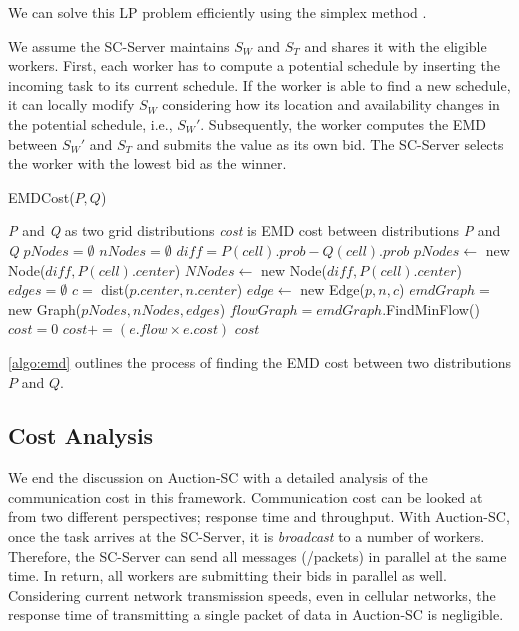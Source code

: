 \noindent We can solve this LP problem efficiently using the simplex method \cite{Dantzig90}.

We assume the SC-Server maintains $S_W$ and $S_T$ and shares it with the eligible workers. First, each worker has to compute a potential schedule by inserting the incoming task to its current schedule. If the worker is able to find a new schedule, it can locally modify $S_W$ considering how its location and availability changes in the potential schedule, i.e., $S_{W}'$. Subsequently, the worker computes the EMD between $S_{W}'$ and $S_T$ and submits the value as its own bid. The SC-Server selects the worker with the lowest bid as the winner.

\begin{algorithm}[h]
\caption{EMDCost($P, Q$)}
\label{algo:emd}
\begin{algorithmic}[1]
\REQUIRE \emph{P} and \emph{Q} as two grid distributions
\ENSURE \emph{cost} is EMD cost between distributions \emph{P} and \emph{Q}
\STATE $pNodes = \emptyset$
\STATE $nNodes = \emptyset$
	\STATE $diff = P(cell).prob - Q(cell).prob$
		\STATE $pNodes \leftarrow$ new Node($diff, P(cell).center$)
	\ELSE
		\STATE $NNodes \leftarrow$ new Node($diff, P(cell).center$)
	\ENDIF
\ENDFOR
\STATE $edges = \emptyset$
		\STATE $c =$ dist($p.center, n.center$)
		\STATE $edge \leftarrow$ new Edge($p, n, c$)
	\ENDFOR
\ENDFOR
\STATE $emdGraph =$ new Graph($pNodes, nNodes, edges$)
\STATE $flowGraph = emdGraph$.FindMinFlow()
\STATE $cost = 0$
	\STATE $cost += (e.flow \times e.cost)$
\ENDFOR
\RETURN $cost$
\end{algorithmic}
\end{algorithm}

\cref{algo:emd} outlines the process of finding the EMD cost between two distributions $P$ and $Q$. 

\subsection{Cost Analysis}

We end the discussion on Auction-SC with a detailed analysis of the communication cost in this framework. Communication cost can be looked at from two different perspectives; response time and throughput. With Auction-SC, once the task arrives at the SC-Server, it is \textit{broadcast} to a number of workers. Therefore, the SC-Server can send all messages (/packets) in parallel at the same time. In return, all workers are submitting their bids in parallel as well. Considering current network transmission speeds, even in cellular networks, the response time of transmitting a single packet of data in Auction-SC is negligible.

